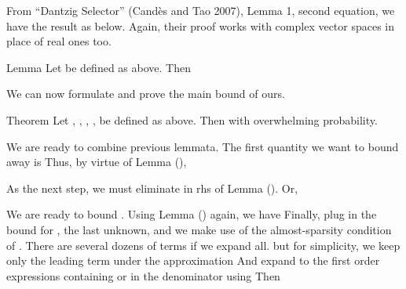 From ``Dantzig Selector'' (Cand\`es and Tao 2007), Lemma 1, second equation, we have the result as below.
Again, their proof works with complex vector spaces in place of real ones too.

\Result
{Lemma}
{
Let  be defined as above.
Then
}

\startsection [title={The Main Bound}]

We can now formulate and prove the main bound of ours.

\Result
{Theorem}
{
Let , , , ,  be defined as above.
Then
with overwhelming probability.
}

We are ready to combine previous lemmata.
The first quantity we want to bound away is
Thus, by virtue of Lemma (),

As the next step, we must eliminate  in rhs of Lemma ().
Or,

We are ready to bound .
Using Lemma () again, we have
Finally, plug in the bound for , the last unknown, and we make use of the almost-sparsity condition of .
There are several dozens of terms if we expand all.
but for simplicity, we keep only the leading term under the approximation
And expand to the first order expressions containing  or  in the denominator using
Then

\color[red]{(To be done)}

\stopchapter
